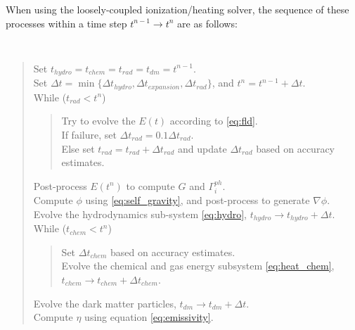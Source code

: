 When using the loosely-coupled ionization/heating solver, the sequence
of these processes within a time step $t^{n-1} \to t^n$ are as follows: 
{\tt
\begin{quote}
Set $t_{hydro}=t_{chem}=t_{rad}=t_{dm} = t^{n-1}$.\\
Set $\Delta t = \min\{\Delta t_{hydro}, \Delta t_{expansion}, \Delta
t_{rad}\}$, and $t^n = t^{n-1}+\Delta t$.\\
While ($t_{rad} < t^n$)
\begin{quote}
  Try to evolve the $E(t)$ according to \eqref{eq:fld}.\\
  If failure, set $\Delta t_{rad} = 0.1\Delta t_{rad}$.\\
  Else set $t_{rad} = t_{rad} + \Delta t_{rad}$ and update $\Delta
  t_{rad}$ based on accuracy estimates.
\end{quote}
Post-process $E(t^n)$ to compute $G$ and $\Gamma_i^{ph}$.\\
Compute $\phi$ using \eqref{eq:self_gravity}, and post-process to
generate $\nabla\phi$.\\ 
Evolve the hydrodynamics sub-system \eqref{eq:hydro}, $t_{hydro} \to
t_{hydro} + \Delta t$.\\
While ($t_{chem} < t^n$)
\begin{quote}
  Set $\Delta t_{chem}$ based on accuracy estimates. \\
  Evolve the chemical and gas energy subsystem \eqref{eq:heat_chem},
  $t_{chem} \to t_{chem} + \Delta t_{chem}$.
\end{quote}
Evolve the dark matter particles, $t_{dm} \to t_{dm} + \Delta t$.\\
Compute $\eta$ using equation \eqref{eq:emissivity}.
\end{quote}
}
